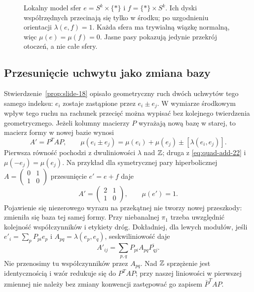 \begin{figure}[htbp]
\centering
{}
\caption{Lokalny model sfer
$e=S^k\times\{*\}$ i $f=\{*\}\times S^k$.
Ich dyski współrzędnych przecinają się
tylko w środku; po uzgodnieniu orientacji
$\lambda(e,f)=1$. Każda sfera ma
trywialną wiązkę normalną, więc
$\mu(e)=\mu(f)=0$. Jasne pasy pokazują
jedynie przekrój otoczeń, a nie całe sfery.}
\label{fig:para-hiperboliczna-22}
\end{figure}

\subsection*{Przesunięcie uchwytu jako zmiana bazy}
Stwierdzenie~\ref{prop:slide-18} opisało geometryczny
ruch dwóch uchwytów tego samego indeksu:
$e_i$ zostaje zastąpione przez $e_i\pm e_j$.
W wymiarze środkowym wpływ tego ruchu na
rachunek przecięć można wypisać bez kolejnego
twierdzenia geometrycznego. Jeżeli kolumny
macierzy $P$ wyrażają nową bazę w starej,
to macierz formy w nowej bazie wynosi
\begin{equation}\label{eq:slide-forma-22}
 A'=P^{T}AP,\qquad
 \mu(e_i\pm e_j)
   =\mu(e_i)+\mu(e_j)
      \pm[\lambda(e_i,e_j)].
\end{equation}
Pierwsza równość pochodzi z dwuliniowości
$\lambda$ nad $\mathbb{Z}$; druga z
\eqref{eq:quad-add-22} i
$\mu(-e_j)=\mu(e_j)$.
Na przykład dla symetrycznej pary hiperbolicznej
$A=\left(\begin{smallmatrix}0&1\\1&0\end{smallmatrix}\right)$
przesunięcie $e'=e+f$ daje
\[
 A'=\begin{pmatrix}2&1\\1&0\end{pmatrix},
 \qquad \mu(e')=1.
\]
Pojawienie się niezerowego wyrazu na przekątnej
nie tworzy nowej przeszkody: zmieniła się baza
tej samej formy. Przy niebanalnej $\pi_1$ trzeba
uwzględnić kolejność współczynników i etykiety dróg.
Dokładniej, dla lewych modułów, jeśli
$e'_i=\sum_p P_{pi}e_p$ i $A_{pq}=\lambda(e_p,e_q)$,
seskwiliniowość daje
\[
 A'_{ij}=\sum_{p,q}P_{pi}A_{pq}\overline{P_{qj}}.
\]
Nie przenosimy tu współczynników przez $A_{pq}$.
Nad $\mathbb{Z}$ sprzężenie jest identycznością i wzór
redukuje się do $P^TAP$; przy naszej liniowości
w pierwszej zmiennej nie należy bez zmiany konwencji
zastępować go zapisem $\bar P^TAP$.

